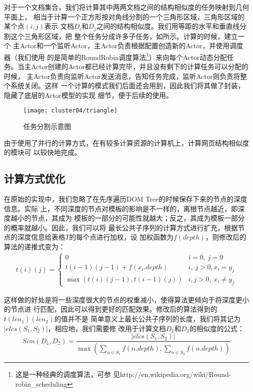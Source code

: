 对于一个文档集合，我们将计算其中两两文档之间的结构相似度的任务映射到几何平面上，
相当于计算一个正方形按对角线分割的一个三角形区域，三角形区域的某个点$(i, j)$表示
文档$D_i$和$D_j$之间的结构相似度。我们用等距的水平和垂直线分割这个三角形区域，把
整个任务分成许多子任务，如所示。计算的时候，建立一个
主Actor和一个监听Actor，主Actor负责根据配置创造新的Actor，并使用调度器（我们使用
的是简单的RoundRobin调度算法\footnote{这是一种经典的调度算法，可参
  见http://en.wikipedia.org/wiki/Round-robin\_scheduling}）来向每个Actor动态分配任
务。当主Actor创建的Actor都已经计算完毕，并且没有剩下的计算任务可以分配的时候，
主Actor负责向监听Actor发送消息，告知任务完成，监听Actor则负责将整个系统关闭。这样
一个计算的模式我们后面还会用到，因此我们将其做了封装，隐藏了底层的Actor模型的实现
细节，便于后续的使用。
\begin{figure}
  \centering
  \texttt{[image: cluster04/triangle]}
  \caption{任务分割示意图}
  \label{cluster:fig:triangle}
\end{figure}

由于使用了并行的计算方式，在有较多计算资源的计算机上，计算网页结构相似度的模块可
以较快地完成。

\subsection{计算方式优化}
在原始的实现中，我们忽略了在先序遍历DOM Tree的时候保存下来的节点的深度信息。实际
上，不同深度的节点对模板的影响是不一样的，离根节点越近，即深度越小的节点，其成为
模板的一部分的可能性就越大；反之，其成为模板一部分的概率就越小。因此，我们可以将
最长公共子序列的计算方式进行扩充，根据节点的深度信息给表格$T$的每个点进行加权，设
加权函数为$f(depth)$，则修改后的算法的递推式变为：
\begin{eqnarray}
  t(i)(j) =
  \begin{cases}
    0 & i = 0,\: j = 0\\
    t(i-1)(j-1) + f(x_i.depth) & i,\: j > 0, x_i=y_j\\
    \max(t(i)(j-1), t(i-1)(j)) & i, j > 0,\: x_i \ne y_j
  \end{cases}
\end{eqnarray}

这样做的好处是将一些深度很大的节点的权重减小，使得算法更倾向于将深度更小的节点进
行匹配，因此可以得到更好的匹配效果。修改后的算法得到的$t(len_1)(len_2)$的值并不是
简单意义上最长公共子序列的长度，我们将其记为$|elcs(S_1,S_2)|$，相应地，我们需要修
改用于计算文档$D_1$和$D_2$的相似度的公式：
\[
Sim(D_1,D_2)=\frac{|elcs(S_1,S_2)|}{\max(\sum\limits_{n\in
    S_1}{f(n.depth)},\sum\limits_{n\in S_2}{f(n.depth)})}
\]
